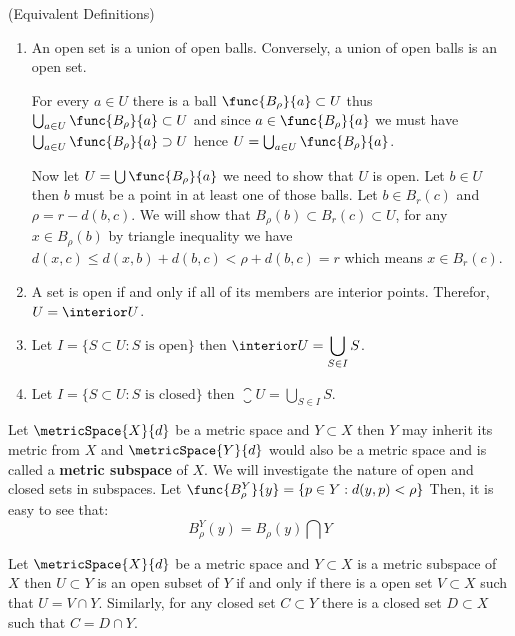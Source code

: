 \begin{remark} (Equivalent Definitions)
    \begin{enumerate}
        \item An open set is a union of open balls. Conversely, a union of open balls is an open set.
              \begin{prooflemma}
                  For every \(a \in U\) there is a ball \(\func{B_\rho}{a} \subset U\) thus \(\bigcup_{a \in U}{\func{B_\rho}{a}} \subset U\) and since \(a \in \func{B_\rho}{a}\) we must have \(\bigcup_{a \in U}{\func{B_\rho}{a}} \supset U\) hence \(U = \bigcup_{a \in U}{\func{B_\rho}{a}}\).

                  Now let \(U = \bigcup {\func{B_\rho}{a}}\) we need to show that \(U\) is open. Let \(b \in U\) then \(b\) must be a point in at least one of those balls. Let \(b \in B_r(c)\) and \(\rho = r - d(b,c)\). We will show that \(B_\rho(b) \subset B_r(c) \subset U\), for any \(x \in B_\rho(b)\) by triangle inequality we have \(d(x,c) \leq d(x,b) + d(b,c) < \rho + d(b,c) = r\) which means \(x \in B_r(c)\).
              \end{prooflemma}
        \item A set is open if and only if all of its members are interior points. Therefor, \(U = \interior U\).
        \item Let \(I = \{ S \subset U : S \text{ is open}\}\) then \(\interior U = \displaystyle{ \bigcup_{S \in I} S}\).
        \item Let \(I = \{ S \subset U : S \text{ is closed}\}\) then \(\closure U = \displaystyle{ \bigcup_{S \in I} S}\).
    \end{enumerate}
\end{remark}

Let \(\metricSpace{X}{d}\) be a metric space and \(Y \subset X\) then \(Y\) may inherit its metric from \(X\) and \(\metricSpace{Y}{d}\) would also be a metric space and is called a \textbf{metric subspace} of \(X\). We will investigate the nature of open and closed sets in subspaces. Let \(\func{B_\rho^Y}{y} = \{ p \in Y : d(y,p) < \rho\}\) Then, it is easy to see that:
\[B_\rho^Y(y) = B_\rho(y) \bigcap Y \]

\begin{corollary} \label{InheritancePrinciple}
    Let \(\metricSpace{X}{d}\) be a metric space and \(Y \subset X\) is a metric subspace of \(X\) then \(U \subset Y\) is an open subset of \(Y\) if and only if there is a open set \(V \subset X\) such that \(U = V \cap Y\). Similarly, for any closed set \(C \subset Y\) there is a closed set \(D \subset X\) such that \(C = D \cap Y\).
\end{corollary}

